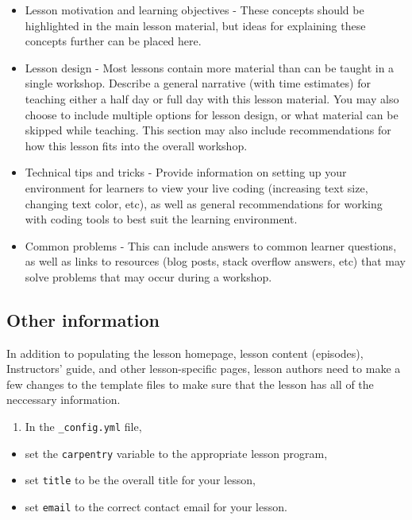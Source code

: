 \documentclass[]{book}
\providecommand{\tightlist}{%
  \setlength{\itemsep}{0pt}\setlength{\parskip}{0pt}}
\begin{document}
\begin{itemize}
\item
  Lesson motivation and learning objectives - These concepts should be highlighted in the main lesson material,
  but ideas for
  explaining these concepts further can be placed here.
\item
  Lesson design - Most lessons contain more material than can be taught in a single workshop.
  Describe a general narrative (with time estimates) for teaching either a half day
  or full day with this lesson material. You may also choose to include multiple
  options for lesson design, or what material can be skipped while teaching.
  This section may also include recommendations for how this lesson fits into
  the overall workshop.
\item
  Technical tips and tricks - Provide information on setting up your environment for learners to view your
  live coding (increasing text size, changing text color, etc), as well as
  general recommendations for working with coding tools to best suit the
  learning environment.
\item
  Common problems - This can include answers to common learner questions, as well as links to
  resources (blog posts, stack overflow answers, etc) that may solve problems that
  may occur during a workshop.
\end{itemize}

\hypertarget{other-information}{%
\subsection{Other information}\label{other-information}}

In addition to populating the lesson homepage, lesson content (episodes),
Instructors' guide, and other lesson-specific
pages, lesson authors need to make a few changes to the template
files to make sure that the lesson has all of the neccessary
information.

\begin{enumerate}
\def\labelenumi{\arabic{enumi}.}
\tightlist
\item
  In the \texttt{\_config.yml} file,
\end{enumerate}

\begin{itemize}
\tightlist
\item
  set the \texttt{carpentry} variable to the appropriate lesson program,
\item
  set \texttt{title} to be the overall title for your lesson,
\item
  set \texttt{email} to the correct contact email for your lesson.
\end{itemize}
\end{document}
